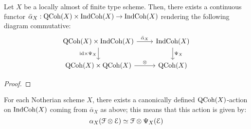                     \begin{proposition} \label{prop: canonical_action_of_qcoh_on_indcoh}
                        Let $X$ be a locally almost of finite type scheme. Then, there exists a continuous functor $\bar{\alpha}_X: \QCoh(X) \x \Ind\Coh(X) \to \Ind\Coh(X)$ rendering the following diagram commutative:
                            $$
                                \begin{tikzcd}
                                	{\QCoh(X) \x \Ind\Coh(X)} & {\Ind\Coh(X)} \\
                                	{\QCoh(X) \x \QCoh(X)} & {\QCoh(X)}
                                	\arrow["{\id \x \Psi_X}"', from=1-1, to=2-1]
                                	\arrow["\tensor", from=2-1, to=2-2]
                                	\arrow["{\bar{\alpha}_X}", from=1-1, to=1-2]
                                	\arrow["{\Psi_X}", from=1-2, to=2-2]
                                \end{tikzcd}
                            $$
                    \end{proposition}
                        \begin{proof}
                            
                        \end{proof}
                    \begin{corollary} \label{coro: canonical_action_of_qcoh_on_indcoh}
                        For each Notherian scheme $X$, there exists a canonically defined $\mathrm{QCoh}(X)$-action on $\mathrm{Ind}\mathrm{Coh}(X)$ coming from $\bar{\alpha}_X$ as above; this means that this action is given by:
                            $$\alpha_X(\calF \tensor \E) \cong \calF \tensor \Psi_X(\E)$$
                    \end{corollary}
                
